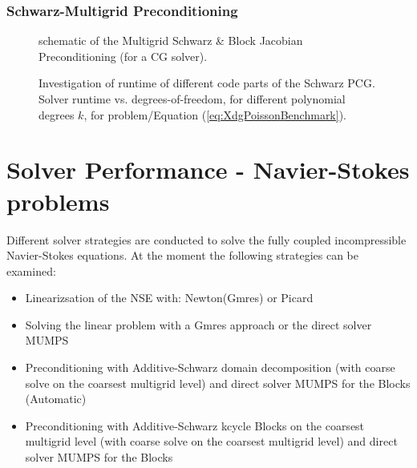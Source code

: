 \subsubsection{Schwarz-Multigrid Preconditioning}

\begin{figure}[!h]
	\begin{center}
		
	\end{center}
	\caption{
		schematic of the Multigrid Schwarz \& Block Jacobian Preconditioning (for a CG solver).
	}
	\label{fig:schema_SchwarzPCG_2}
\end{figure}

\newpage
\begin{figure}[!h]
	\begin{center}
		
	\end{center}
	\caption{
		Investigation of runtime of different code parts of the Schwarz PCG. Solver runtime vs. degrees-of-freedom, for different polynomial degrees $k$,
		for problem/Equation (\ref{eq:XdgPoissonBenchmark}).
	}
	\label{fig:Xdg_SchwarzPGC}
\end{figure}
\newpage


\section{Solver Performance - Navier-Stokes problems}
\label{sec:SolverPerformanceNSE}
Different solver strategies are conducted to solve the fully coupled incompressible Navier-Stokes equations. At the moment the following strategies can be examined:
\begin{itemize}
	\item Linearizsation of the NSE with: Newton(Gmres) or Picard
	\item Solving the linear problem with a Gmres approach or the direct solver MUMPS
	\item Preconditioning with Additive-Schwarz domain decomposition (with coarse solve on the coarsest multigrid level) and direct solver MUMPS for the Blocks (Automatic)
	\item Preconditioning with Additive-Schwarz kcycle Blocks on the coarsest multigrid level (with coarse solve on the coarsest multigrid level) and direct solver MUMPS for the Blocks
\end{itemize}
